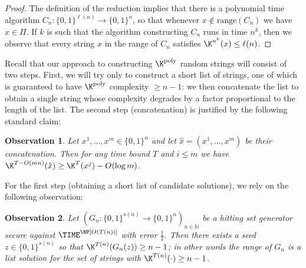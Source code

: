 \documentclass[11pt]{article}
\newtheorem{observation}{Observation}
\newcommand{\B}{\{0,1\}}
\renewcommand{\poly}{\mathrm{poly}}
\begin{document}
\begin{proof}
The definition of the reduction implies that there is a polynomial time algorithm $C_n: \B^{\ell(n)} \to \B^n$, so that whenever $x \notin \mathrm{range}(C_n)$ we have $x \in \Pi$. If $k$ is such that the algorithm constructing $C_n$ runs in time $n^k$, then we observe that every string $x$ in the range of $C_n$ satisfies $\K^{n^k}(x) \leq \ell(n)$.
\end{proof}



Recall that our approach to constructing $\K^{\poly}$ random strings will consist of two steps. First, we will try only to construct a short list of strings, one of which is guaranteed to have $\K^{\poly}$ complexity $\geq n-1$: we then concatenate the list to obtain a single string whose complexity degrades by a factor proportional to the length of the list. The second step (concatenation) is justified by the following standard claim:
\begin{observation}\label{obs:concat}
Let $x^1,\ldots,x^m \in \B^n$ and let $\hat{x} = (x^1,\ldots,x^m)$ be their concatenation. Then for any time bound $T$ and $i \leq m$ we have $\K^{T - O(mn)}(\hat{x}) \geq \K^{T}(x^j) - O(\log m)$.
\end{observation}
For the first step (obtaining a short list of candidate solutions), we rely on the following observation:
\begin{observation}\label{obs:prg-avoid}
Let $(G_n: \B^{s(n)} \to \B^n)_{n \in \mathbb{N}}$ be a hitting set generator secure against $\TIME^\NP[O(T(n))]$ with error $\frac{1}{2}$. Then there exists a seed $z \in \B^{s(n)}$ so that $\K^{T(n)}(G_n(z)) \geq n-1$; in other words the range of $G_n$ is a list solution for the set of strings with $\K^{T(n)}(\cdot) \geq n-1$.
\end{observation}
\end{document}
